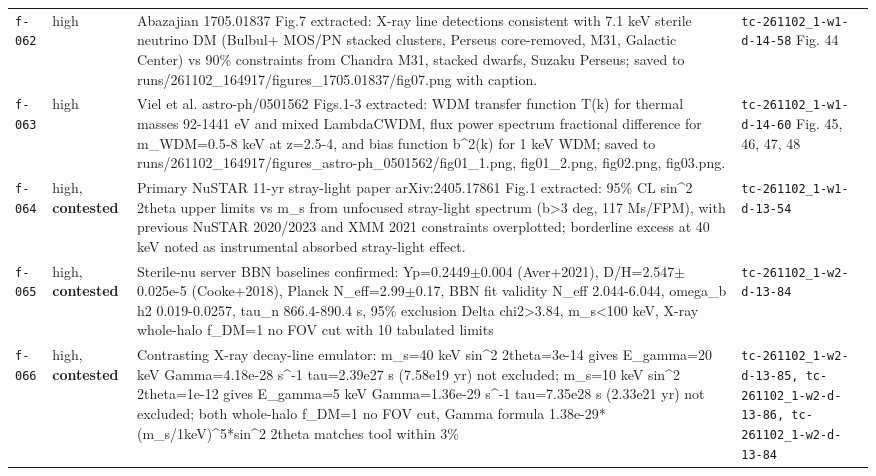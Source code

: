 \documentclass[11pt,a4paper]{article}
\begin{document}
\begin{longtable}{@{}p{}p{}p{}p{}@{}}
\texttt{f-062} & high & Abazajian 1705.01837 Fig.7 extracted: X-ray line detections consistent with 7.1 keV sterile neutrino DM (Bulbul+ MOS/PN stacked clusters, Perseus core-removed, M31, Galactic Center) vs 90\% constraints from Chandra M31, stacked dwarfs, Suzaku Perseus; saved to runs/261102\_164917/figures\_1705.01837/fig07.png with caption. & \texttt{tc-261102\_\allowbreak{}1-w1-d-14-58} Fig. 44 \\
\texttt{f-063} & high & Viel et al. astro-ph/0501562 Figs.1-3 extracted: WDM transfer function T(k) for thermal masses 92-1441 eV and mixed LambdaCWDM, flux power spectrum fractional difference for m\_WDM=0.5-8 keV at z=2.5-4, and bias function b\textasciicircum{}2(k) for 1 keV WDM; saved to runs/261102\_164917/figures\_astro-ph\_0501562/fig01\_1.png, fig01\_2.png, fig02.png, fig03.png. & \texttt{tc-261102\_\allowbreak{}1-w1-d-14-60} Fig. 45, 46, 47, 48 \\
\texttt{f-064} & high, \textbf{contested} & Primary NuSTAR 11-yr stray-light paper arXiv:2405.17861 Fig.1 extracted: 95\% CL sin\textasciicircum{}2 2theta upper limits vs m\_s from unfocused stray-light spectrum (\textbar{}b\textbar{}\textgreater{}3 deg, 117 Ms/FPM), with previous NuSTAR 2020/2023 and XMM 2021 constraints overplotted; borderline excess at 40 keV noted as instrumental absorbed stray-light effect. & \texttt{tc-261102\_\allowbreak{}1-w1-d-13-54} \\
\texttt{f-065} & high, \textbf{contested} & Sterile-nu server BBN baselines confirmed: Yp=0.2449$\pm$0.004 (Aver+2021), D/H=2.547$\pm$0.025e-5 (Cooke+2018), Planck N\_eff=2.99$\pm$0.17, BBN fit validity N\_eff 2.044-6.044, omega\_b h2 0.019-0.0257, tau\_n 866.4-890.4 s, 95\% exclusion Delta chi2\textgreater{}3.84, m\_s\textless{}100 keV, X-ray whole-halo f\_DM=1 no FOV cut with 10 tabulated limits & \texttt{tc-261102\_\allowbreak{}1-w2-d-13-84} \\
\texttt{f-066} & high, \textbf{contested} & Contrasting X-ray decay-line emulator: m\_s=40 keV sin\textasciicircum{}2 2theta=3e-14 gives E\_gamma=20 keV Gamma=4.18e-28 s\textasciicircum{}-1 tau=2.39e27 s (7.58e19 yr) not excluded; m\_s=10 keV sin\textasciicircum{}2 2theta=1e-12 gives E\_gamma=5 keV Gamma=1.36e-29 s\textasciicircum{}-1 tau=7.35e28 s (2.33e21 yr) not excluded; both whole-halo f\_DM=1 no FOV cut, Gamma formula 1.38e-29*(m\_s/1keV)\textasciicircum{}5*sin\textasciicircum{}2 2theta matches tool within 3\% & \texttt{tc-261102\_\allowbreak{}1-w2-d-13-85,\allowbreak{} tc-261102\_\allowbreak{}1-w2-d-13-86,\allowbreak{} tc-261102\_\allowbreak{}1-w2-d-13-84} \\

\end{longtable}
\end{document}
